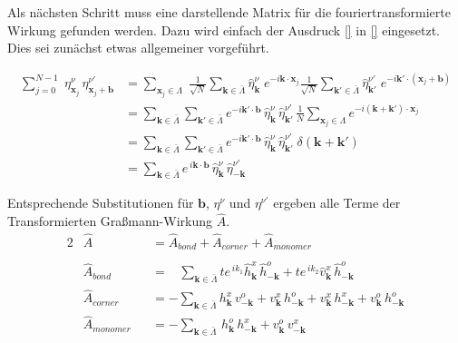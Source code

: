 \noindent Als nächsten Schritt muss eine darstellende Matrix für die fouriertransformierte Wirkung gefunden werden. Dazu wird einfach der Ausdruck  \eqref{} in \eqref{} eingesetzt. Dies sei zunächst etwas allgemeiner vorgeführt.

\begin{align}
\sum_{j = 0}^{N-1} \; \eta^{\nu}_{\bm{x}_j} \,\eta^{\nu'}_{\bm{x}_j+\bm{b}}
& = \sum_{\bm{x}_j \in \Lambda} \; \frac{1}{\sqrt{N}} \sum_{\bm{k} \in \bar{\Lambda}} \hat{\eta}_{\bm{k}}^{\nu}\; e^{-i \bm{k} \cdot \bm{x}_j} \frac{1}{\sqrt{N}} \sum_{\bm{k'} \in \bar{\Lambda}} \hat{\eta}_{\bm{k'}}^{\nu'}\; e^{-i  \bm{k'} \cdot (\bm{x}_j+\bm{b})} \nonumber \\
&  = \sum_{\bm{k} \in \bar{\Lambda}} \sum_{\bm{k'} \in \bar{\Lambda}} e^{-i  \bm{k'} \cdot \bm{b}} \, \hat{\eta}_{\bm{k}}^{\nu}\, \hat{\eta}_{\bm{k'}}^{\nu'} \, \frac{1}{N} \sum_{\bm{x}_j \in \Lambda} e^{-i (\bm{k} + \bm{k'})\cdot \bm{x}_j } \nonumber \\ 
&  = \sum_{\bm{k} \in \bar{\Lambda}} \sum_{\bm{k'} \in \bar{\Lambda}} e^{-i  \bm{k'} \cdot \bm{b}} \, \hat{\eta}_{\bm{k}}^{\nu} \, \hat{\eta}_{\bm{k'}}^{\nu'} \; \delta(\bm{k} + \bm{k'}) \nonumber \\
& = \sum_{\bm{k} \in \bar{\Lambda}}  e^{\,i  \bm{k} \cdot \bm{b}} \,\hat{\eta}_{\bm{k}}^{\nu}\, \hat{\eta}_{-\bm{k}}^{\nu'} \nonumber
\end{align}

\noindent Entsprechende Substitutionen für $\bm{b}$, $\eta^{\nu}$ und $\eta^{\nu'}$ ergeben alle Terme der Transformierten Graßmann-Wirkung $\hat{A}$.
\begin{alignat}{2}
        & \hat{A}   &&= \hat{A}_{bond} + \hat{A}_{corner} + \hat{A}_{monomer} \nonumber \\
        \nonumber \\
        &\hat{A}_{bond} &&= \;\;\; \sum_{\bm{k} \in \bar{\Lambda}}  
            t e^{\,i k_1} \hat{h}_{\bm{k}}^{x} \, \hat{h}_{-\bm{k}}^{o} 
            + t e^{\,i k_2} \hat{v}_{\bm{k}}^{x} \, \hat{h}_{-\bm{k}}^{o}  \nonumber\\
       & \hat{A}_{corner} &&= -\sum_{\bm{k} \in \bar{\Lambda}} 
            h_{\bm{k}}^x \,v_{-\bm{k}}^o 
            + v_{\bm{k}}^x\, h_{-\bm{k}}^o
            + v_{\bm{k}}^x \,h_{-\bm{k}}^x 
            + v_{\bm{k}}^o \,h_{-\bm{k}}^o \nonumber\\
       &  \hat{A}_{monomer}&&= -\sum_{\bm{k} \in \bar{\Lambda}} 
            \, h_{\bm{k}}^o \,h_{-\bm{k}}^x
            +  v_{\bm{k}}^o \,v_{-\bm{k}}^x \nonumber
\end{alignat}

